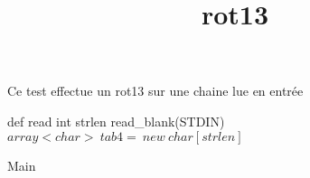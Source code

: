 \documentclass[8pt]{article}
\title{rot13}
\begin{document}
\maketitle



Ce test effectue un rot13 sur une chaine lue en entr\'ee


\begin{algorithm}[H]
def read int strlen
read\_blank(STDIN)\;
$array<char>\:tab4=\:new\:char[strlen]$\;

\caption{Main}
\end{algorithm}
\end{document}
